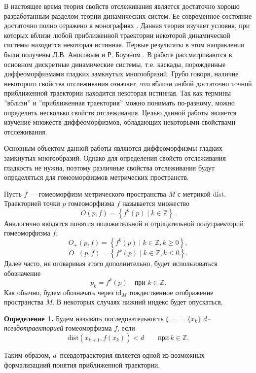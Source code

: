 \documentclass[12pt]{article}
\begin{document}
В настоящее время теория свойств отслеживания является достаточно хорошо разработанным разделом теории динамических систем. Ее современное состояние достаточно полно отражено в монографиях \cite{1,2}. Данная теория изучает 
условия, при которых вблизи любой приближенной траектории некоторой динамической системы находится некоторая истинная. Первые результаты в этом направлении были получены Д.В. Аносовым \cite{An} и Р. Боуэном \cite{Bo}.
В работе рассматриваются в основном дискретные динамические системы, т.е. каскады, порожденные диффеоморфизмами гладких замкнутых многообразий. Грубо говоря, наличие некоторого свойства отслеживания означает, что вблизи любой достаточно точной приближенной траектории находится некоторая истинная. Так как термины ''вблизи'' и ''приближенная траектория'' можно понимать по-разному, можно определить несколько свойств отслеживания. Целью данной работы является изучение множеств диффеоморфизмов, обладающих некоторыми свойствами отслеживания. %

Основным объектом данной работы являются диффеоморфизмы гладких замкнутых многообразий. Однако для определения свойств отслеживания гладкость не нужна, поэтому различные свойства отслеживания будут определяться для гомеоморфизмов метрических пространств. 

Пусть $f$ --- гомеоморфизм метрического пространства $M$ с метрикой dist.  
Траекторией точки $p$ гомеоморфизма $f$ называется множество
$$O(p,f)=\left\{f^k(p)\mid k\in\mathbb{Z}\right\}.$$
Аналогично вводятся понятия положительной и отрицательной полу\-траекторий гомеоморфизма $f$:
$$O_{+}(p,f)=\left\{f^k(p)\mid k\in\mathbb{Z}, k\geq 0\right\},$$
$$O_{-}(p,f)=\left\{f^k(p)\mid k\in\mathbb{Z}, k\leq 0\right\}.$$ 
Далее часто, не оговаривая этого дополнительно, будет использоваться обозначение
$$p_k=f^k(p)\quad\textrm{при }k\in\mathbb{Z}.$$
Как обычно, будем обозначать через $\mbox{id}_M$ тождественное отображение пространства $M$. В некоторых случаях нижний индекс будет опускаться. 

\textbf{Определение 1.} 
Будем называть последователь\-ность $\xi=\allowbreak=\{x_k\}$ 
\textit{$d$--псевдотраек\-торией} гомеоморфизма $f$, если 
$$\mbox{dist}(x_{k+1},f(x_k))<d\qquad\mbox{при}\ k\in\mathbb{Z}.$$

Таким образом, $d$--псевдотраектория является одной из возможных формализациий понятия приближенной траектории. 
\end{document}
